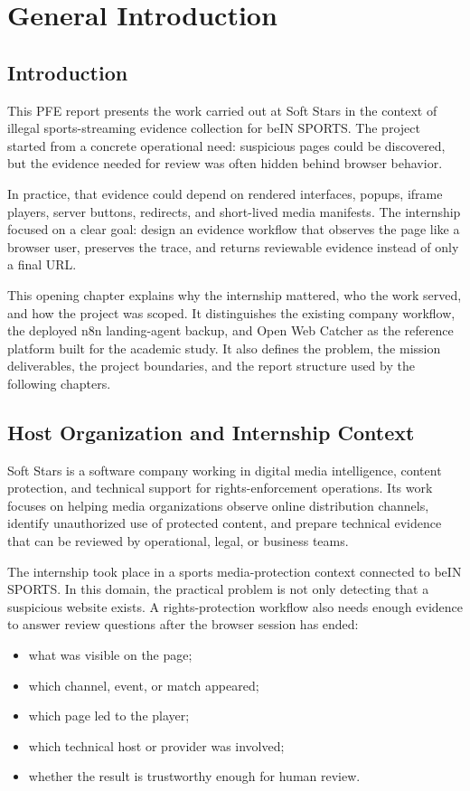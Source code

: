 \chapter{General Introduction}\label{chap:introduction}

\section{Introduction}

This PFE report presents the work carried out at Soft Stars in the context of
illegal sports-streaming evidence collection for beIN SPORTS\@. The project started
from a concrete operational need: suspicious pages could be discovered, but the
evidence needed for review was often hidden behind browser behavior.

In practice, that evidence could depend on rendered interfaces, popups, iframe
players, server buttons, redirects, and short-lived media manifests. The internship
focused on a clear goal: design an evidence workflow that observes the
page like a browser user, preserves the trace, and returns reviewable evidence instead
of only a final URL\@.

This opening chapter explains why the internship mattered, who the work served, and
how the project was scoped. It distinguishes the existing company
workflow, the deployed n8n landing-agent backup, and Open Web Catcher as the reference
platform built for the academic study. It also defines the problem, the mission
deliverables, the project boundaries, and the report structure used by the following
chapters.

\section{Host Organization and Internship Context}

Soft Stars is a software company working in digital media intelligence, content
protection, and technical support for rights-enforcement operations. Its work focuses
on helping media organizations observe online distribution channels, identify
unauthorized use of protected content, and prepare technical evidence that can be
reviewed by operational, legal, or business teams.

The internship took place in a sports media-protection context connected to beIN
SPORTS\@. In this domain, the practical problem is not only detecting that a suspicious
website exists. A rights-protection workflow also needs enough evidence to answer
review questions after the browser session has ended:
\begin{itemize}
  \item what was visible on the page;
  \item which channel, event, or match appeared;
  \item which page led to the player;
  \item which technical host or provider was involved;
  \item whether the result is trustworthy enough for human review.
\end{itemize}

